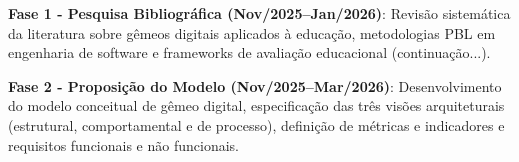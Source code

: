 \documentclass[12pt,a4paper]{article}
\begin{document}
\begin{table}[htbp]
  \centering
  \caption{Cronograma de Execução da Pesquisa}
  \label{tab:cronograma}
  \small
  \setlength{\tabcolsep}{4pt}
\end{table}

\textbf{Fase 1 - Pesquisa Bibliográfica (Nov/2025–Jan/2026)}: Revisão sistemática da literatura sobre gêmeos digitais aplicados à educação, metodologias PBL em engenharia de software e frameworks de avaliação educacional (continuação...).

\textbf{Fase 2 - Proposição do Modelo (Nov/2025–Mar/2026)}: Desenvolvimento do modelo conceitual de gêmeo digital, especificação das três visões arquiteturais (estrutural, comportamental e de processo), definição de métricas e indicadores e requisitos funcionais e não funcionais.
\end{document}
